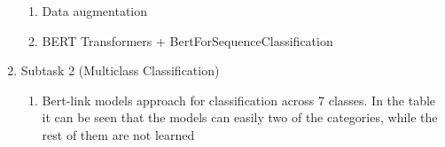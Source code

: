 \documentclass[11pt]{article}
\begin{document}
\begin{enumerate}
\begin{enumerate}
		      \item Data augmentation


		      \item BERT Transformers + BertForSequenceClassification

	      \end{enumerate}

	\item Subtask 2 (Multiclass Classification)

	      \begin{enumerate}
		      \item Bert-link models approach for classification across 7 classes. In the table it
                      can be seen that the models can easily two of the categories,
                      while the rest of them are not learned


\end{enumerate}
\end{enumerate}
\end{document}
